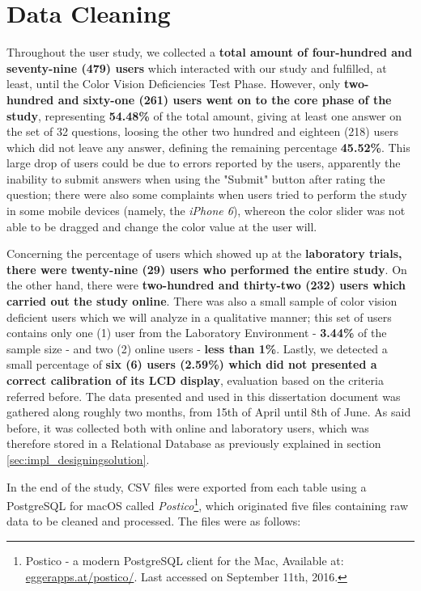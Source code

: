 \section{Data Cleaning}
\label{sec:results_datacleaning}
%
Throughout the user study, we collected a \textbf{total amount of four-hundred and seventy-nine (479) users} which interacted with our study and fulfilled,
at least, until the Color Vision Deficiencies Test Phase. However, only \textbf{two-hundred and sixty-one (261) users went on to the core phase of the study},
representing \textbf{54.48\%} of the total amount, giving at least one answer on the set of 32 questions, loosing the other two hundred and eighteen
(218) users which did not leave any answer, defining the remaining percentage \textbf{45.52\%}. This large drop of users could be due to errors
reported by the users, apparently the inability to submit answers when using the "Submit" button after rating the question; there were also some complaints
when users tried to perform the study in some mobile devices (namely, the \emph{iPhone\textsuperscript{\textregistered} 6}), whereon the color slider was
not able to be dragged and change the color value at the user will. \par
%
Concerning the percentage of users which showed up at the \textbf{laboratory trials, there were twenty-nine (29) users who performed the entire study}.
On the other hand, there were \textbf{two-hundred and thirty-two (232) users which carried out the study online}. There was also a small sample of color vision
deficient users which we will analyze in a qualitative manner; this set of users contains only one (1) user from the Laboratory Environment - \textbf{3.44\%} of
the sample size - and two (2) online users - \textbf{less than 1\%}. Lastly, we detected a small percentage of \textbf{six (6) users (2.59\%) which did not
presented a correct calibration of its LCD display}, evaluation based on the criteria referred before.
%
The data presented and used in this dissertation document was gathered along roughly two months, from 15th of April until 8th of June. As said before,
it was collected both with online and laboratory users, which was therefore stored in a Relational Database as previously explained in section
\ref{sec:impl_designingsolution}. \par
%
In the end of the study, \gls{CSV} files were exported from each table using a PostgreSQL for macOS called
\emph{Postico}\footnote{Postico - a modern PostgreSQL client for the Mac, Available at: \url{eggerapps.at/postico/}. Last accessed on
September 11th, 2016.}, which originated five files containing raw data to be cleaned and processed. The files were as follows:
